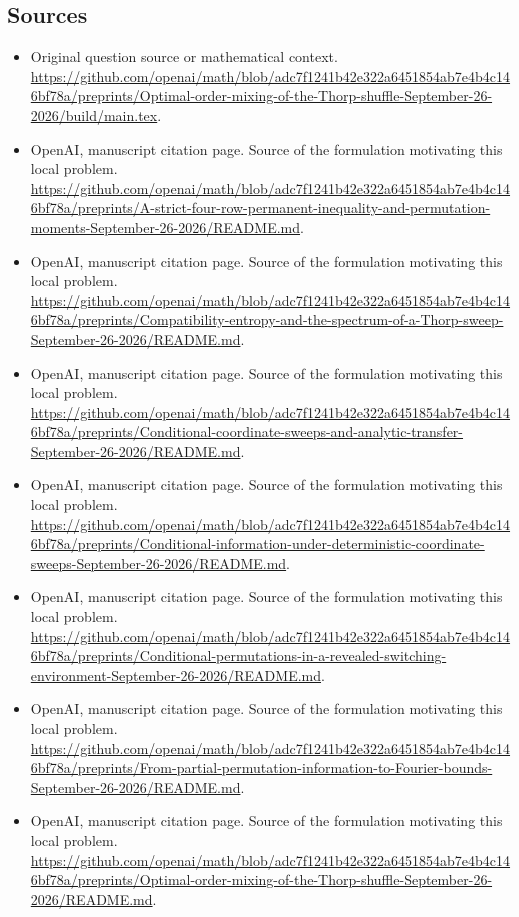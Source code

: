 \documentclass[11pt]{article}
\begin{document}
\subsection{Sources}
\begin{itemize}
\item[S1] Original question source or mathematical context.
\url{https://github.com/openai/math/blob/adc7f1241b42e322a6451854ab7e4b4c146bf78a/preprints/Optimal-order-mixing-of-the-Thorp-shuffle-September-26-2026/build/main.tex}.
\item[S2] OpenAI, manuscript citation page. Source of the formulation motivating this local problem.
\url{https://github.com/openai/math/blob/adc7f1241b42e322a6451854ab7e4b4c146bf78a/preprints/A-strict-four-row-permanent-inequality-and-permutation-moments-September-26-2026/README.md}.
\item[S3] OpenAI, manuscript citation page. Source of the formulation motivating this local problem.
\url{https://github.com/openai/math/blob/adc7f1241b42e322a6451854ab7e4b4c146bf78a/preprints/Compatibility-entropy-and-the-spectrum-of-a-Thorp-sweep-September-26-2026/README.md}.
\item[S4] OpenAI, manuscript citation page. Source of the formulation motivating this local problem.
\url{https://github.com/openai/math/blob/adc7f1241b42e322a6451854ab7e4b4c146bf78a/preprints/Conditional-coordinate-sweeps-and-analytic-transfer-September-26-2026/README.md}.
\item[S5] OpenAI, manuscript citation page. Source of the formulation motivating this local problem.
\url{https://github.com/openai/math/blob/adc7f1241b42e322a6451854ab7e4b4c146bf78a/preprints/Conditional-information-under-deterministic-coordinate-sweeps-September-26-2026/README.md}.
\item[S6] OpenAI, manuscript citation page. Source of the formulation motivating this local problem.
\url{https://github.com/openai/math/blob/adc7f1241b42e322a6451854ab7e4b4c146bf78a/preprints/Conditional-permutations-in-a-revealed-switching-environment-September-26-2026/README.md}.
\item[S7] OpenAI, manuscript citation page. Source of the formulation motivating this local problem.
\url{https://github.com/openai/math/blob/adc7f1241b42e322a6451854ab7e4b4c146bf78a/preprints/From-partial-permutation-information-to-Fourier-bounds-September-26-2026/README.md}.
\item[S8] OpenAI, manuscript citation page. Source of the formulation motivating this local problem.
\url{https://github.com/openai/math/blob/adc7f1241b42e322a6451854ab7e4b4c146bf78a/preprints/Optimal-order-mixing-of-the-Thorp-shuffle-September-26-2026/README.md}.

\end{itemize}
\end{document}
